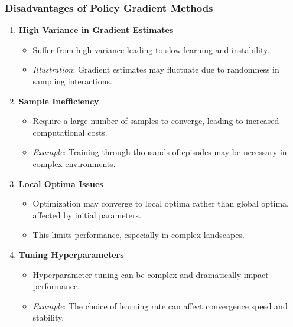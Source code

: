 \documentclass{beamer}
\begin{document}
\begin{frame}[fragile]
    \frametitle{Disadvantages of Policy Gradient Methods}
    \begin{enumerate}
        \item \textbf{High Variance in Gradient Estimates}
        \begin{itemize}
            \item Suffer from high variance leading to slow learning and instability.
            \item \textit{Illustration}: Gradient estimates may fluctuate due to randomness in sampling interactions.
        \end{itemize}

        \item \textbf{Sample Inefficiency}
        \begin{itemize}
            \item Require a large number of samples to converge, leading to increased computational costs.
            \item \textit{Example}: Training through thousands of episodes may be necessary in complex environments.
        \end{itemize}

        \item \textbf{Local Optima Issues}
        \begin{itemize}
            \item Optimization may converge to local optima rather than global optima, affected by initial parameters.
            \item This limits performance, especially in complex landscapes.
        \end{itemize}

        \item \textbf{Tuning Hyperparameters}
        \begin{itemize}
            \item Hyperparameter tuning can be complex and dramatically impact performance.
            \item \textit{Example}: The choice of learning rate can affect convergence speed and stability.
        \end{itemize}
    \end{enumerate}
\end{frame}
\end{document}
